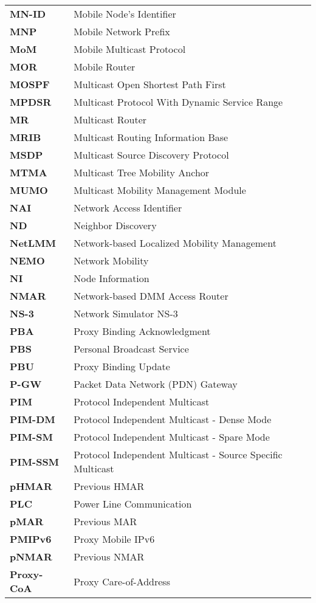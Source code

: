 \begin{center}
\begin{longtable}{p{5cm}p{8.8cm}}
\textbf{MN-ID} & Mobile Node's Identifier\\
\textbf{MNP} & Mobile Network Prefix \\
\textbf{MoM} & Mobile Multicast Protocol \\
\textbf{MOR} & Mobile Router \\
\textbf{MOSPF} & Multicast Open Shortest Path First \\
\textbf{MPDSR} & Multicast Protocol With Dynamic Service Range  \\
\textbf{MR} & Multicast Router \\
\textbf{MRIB} & Multicast Routing Information Base \\
\textbf{MSDP} & Multicast Source Discovery Protocol \\
\textbf{MTMA} & Multicast Tree Mobility Anchor \\
\textbf{MUMO} & Multicast Mobility Management Module \\
\textbf{NAI} & Network Access Identifier\\
\textbf{ND} & Neighbor Discovery\\
\textbf{NetLMM} & Network-based Localized Mobility Management  \\
\textbf{NEMO} & Network Mobility\\
\textbf{NI} & Node Information\\
\textbf{NMAR} & Network-based DMM Access Router \\
\textbf{NS-3} & Network Simulator NS-3 \\

\textbf{PBA} & Proxy Binding Acknowledgment \\
\textbf{PBS} & Personal Broadcast Service \\
\textbf{PBU} & Proxy Binding Update\\
\textbf{P-GW} & Packet Data Network (PDN) Gateway\\
\textbf{PIM} & Protocol Independent Multicast\\
\textbf{PIM-DM} & Protocol Independent Multicast - Dense Mode\\
\textbf{PIM-SM} & Protocol Independent Multicast - Spare Mode\\
\textbf{PIM-SSM} & Protocol Independent Multicast - Source Specific Multicast\\
\textbf{pHMAR} & Previous HMAR \\
\textbf{PLC} & Power Line Communication \\
\textbf{pMAR} & Previous MAR\\
\textbf{PMIPv6} & Proxy Mobile IPv6\\
\textbf{pNMAR} & Previous NMAR\\
\textbf{Proxy-CoA} & Proxy Care-of-Address\\


\end{longtable}
\end{center}
